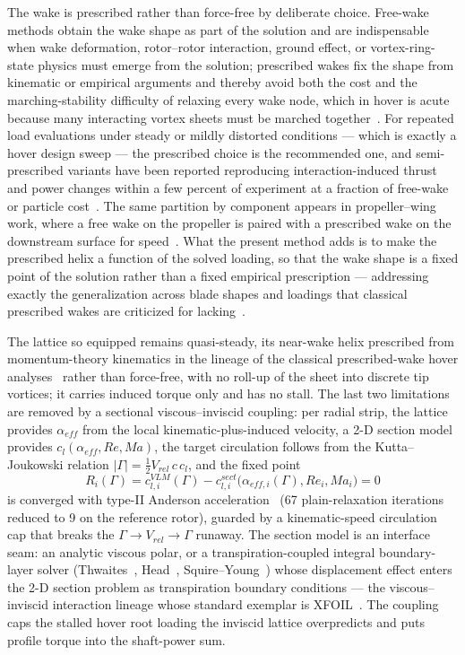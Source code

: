 \documentclass[]{aiaa-tc}%
\begin{document}
The wake is prescribed rather than force-free by deliberate choice.
Free-wake methods obtain the wake shape as part of the solution and
are indispensable when wake deformation, rotor--rotor interaction,
ground effect, or vortex-ring-state physics must emerge from the
solution; prescribed wakes fix the shape from kinematic or empirical
arguments and thereby avoid both the cost and the marching-stability
difficulty of relaxing every wake node, which in hover is acute
because many interacting vortex sheets must be marched
together~\cite{murua2012,leishman2002}. For repeated load evaluations
under steady or mildly distorted conditions --- which is exactly a
hover design sweep --- the prescribed choice is the recommended one,
and semi-prescribed variants have been reported reproducing
interaction-induced thrust and power changes within a few percent of
experiment at a fraction of free-wake or particle
cost~\cite{erhardAlonso2024}. The same partition by component appears
in propeller--wing work, where a free wake on the propeller is paired
with a prescribed wake on the downstream surface for
speed~\cite{ribeiro2023}. What the present method adds is to make the
prescribed helix a function of the solved loading, so that the wake
shape is a fixed point of the solution rather than a fixed empirical
prescription --- addressing exactly the generalization across blade
shapes and loadings that classical prescribed wakes are criticized
for lacking~\cite{murua2012}.

The lattice so equipped remains quasi-steady, its near-wake helix
prescribed from momentum-theory kinematics in the lineage of the
classical prescribed-wake hover
analyses~\cite{kocurekTangler1977} rather than force-free,
with no roll-up of the sheet into discrete tip vortices; it carries
induced torque only and has no
stall. The last two limitations are removed by a sectional
viscous--inviscid coupling: per radial strip, the lattice provides
$\alpha_{eff}$ from the local kinematic-plus-induced velocity, a 2-D
section model provides $c_l(\alpha_{eff}, Re, Ma)$, the target
circulation follows from the Kutta--Joukowski relation
$|\Gamma| = \tfrac{1}{2} V_{rel}\, c\, c_l$, and the fixed point
\begin{equation}
 \label{e:residual}
 R_i(\Gamma) = c_{l,i}^{VLM}(\Gamma)
   - c_{l,i}^{sect}\!\bigl(\alpha_{eff,i}(\Gamma), Re_i, Ma_i\bigr) = 0
\end{equation}
is converged with type-II Anderson
acceleration~\cite{anderson1965,walkerNi2011}
(67 plain-relaxation iterations reduced to 9 on the reference rotor),
guarded by a kinematic-speed circulation cap that breaks the
$\Gamma \to V_{rel} \to \Gamma$ runaway. The section model is an
interface seam: an analytic viscous polar, or a transpiration-coupled
integral boundary-layer solver (Thwaites~\cite{thwaites1949},
Head~\cite{head1958}, Squire--Young~\cite{squireYoung1938}) whose
displacement effect enters the 2-D section problem as transpiration
boundary conditions --- the viscous--inviscid interaction lineage
whose standard exemplar is XFOIL~\cite{drela1989}. The coupling caps
the stalled hover root loading
the inviscid lattice overpredicts and puts profile torque into the
shaft-power sum.
\end{document}
